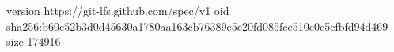 version https://git-lfs.github.com/spec/v1
oid sha256:b60c52b3d0d45630a1780aa163eb76389e5c20fd085fce510c0c5cfbfd94d469
size 174916
